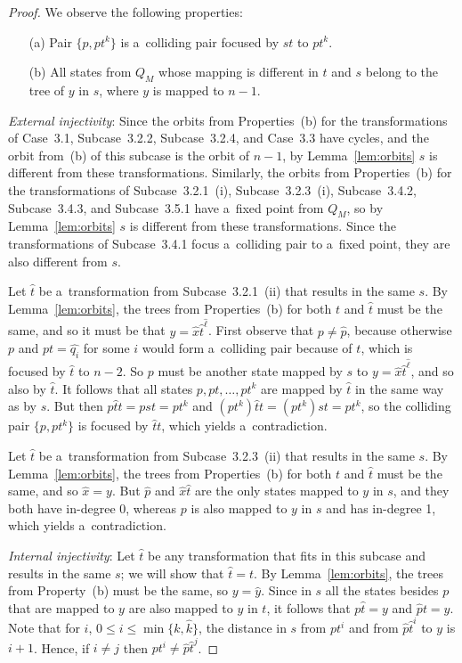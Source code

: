 \documentclass{amsart}
\renewcommand{\le}{\leqslant}
\newcommand{\e}[1]{\hat{#1}}
\begin{document}
\begin{proof}
We observe the following properties:
\begin{enumerate}
\item[(a)] Pair $\{p,pt^k\}$ is a~colliding pair focused by $st$ to $pt^k$.

\item[(b)] All states from $Q_M$ whose mapping is different in $t$ and $s$ belong to the tree of $y$ in $s$, where $y$ is mapped to $n-1$.
\end{enumerate}

\textit{External injectivity}:
Since the orbits from Properties~(b) for the transformations of Case~3.1, Subcase~3.2.2, Subcase~3.2.4, and Case~3.3 have cycles, and the orbit from~(b) of this subcase is the orbit of $n-1$, by Lemma~\ref{lem:orbits} $s$ is different from these transformations.
Similarly, the orbits from Properties~(b) for the transformations of Subcase~3.2.1~(i), Subcase~3.2.3~(i), Subcase~3.4.2, Subcase~3.4.3, and Subcase~3.5.1 have a~fixed point from $Q_M$, so by Lemma~\ref{lem:orbits} $s$ is different from these transformations.
Since the transformations of Subcase~3.4.1 focus a~colliding pair to a~fixed point, they are also different from $s$.

Let $\e{t}$ be a~transformation from Subcase~3.2.1~(ii) that results in the same $s$.
By Lemma~\ref{lem:orbits}, the trees from Properties~(b) for both $t$ and $\e{t}$ must be the same, and so it must be that $y = \e{x}\e{t}^{\e{\ell}}$.
First observe that $p \neq \e{p}$, because otherwise $p$ and $pt=\e{q_i}$ for some $i$ would form a~colliding pair because of $t$, which is focused by $\e{t}$ to $n-2$.
So $p$ must be another state mapped by $s$ to $y = \e{x}\e{t}^{\e{\ell}}$, and so also by $\e{t}$.
It follows that all states $p,pt,\ldots,pt^k$ are mapped by $\e{t}$ in the same way as by $s$.
But then $p \e{t} t = p s t = pt^k$ and $(pt^k)\e{t} t = (pt^k)s t = pt^k$, so the colliding pair $\{p,pt^k\}$ is focused by $\e{t}t$, which yields a~contradiction.

Let $\e{t}$ be a~transformation from Subcase~3.2.3~(ii) that results in the same $s$.
By Lemma~\ref{lem:orbits}, the trees from Properties~(b) for both $t$ and $\e{t}$ must be the same, and so $\e{x} = y$.
But $\e{p}$ and $\e{x}\e{t}$ are the only states mapped to $y$ in $s$, and they both have in-degree 0, whereas $p$ is also mapped to $y$ in $s$ and has in-degree 1, which yields a~contradiction.

\textit{Internal injectivity}:
Let $\e{t}$ be any transformation that fits in this subcase and results in the same $s$; we will show that $\e{t}=t$.
By Lemma~\ref{lem:orbits}, the trees from Property~(b) must be the same, so $y = \e{y}$.
Since in $s$ all the states besides $p$ that are mapped to $y$ are also mapped to $y$ in $t$, it follows that $p \e{t} = y$ and $\e{p} t = y$.
Note that for $i$, $0 \le i \le \min\{k,\e{k}\}$, the distance in $s$ from $p t^i$ and from $\e{p} \e{t}^i$ to $y$ is $i+1$.
Hence, if $i \neq j$ then $p t^i \neq \e{p} \e{t}^j$.


\end{proof}
\end{document}
